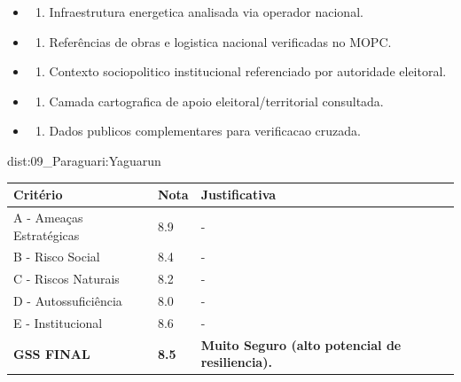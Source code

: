 {\begin{itemize}
\item
  \begin{enumerate}
  \def\labelenumi{\arabic{enumi})}
  \setcounter{enumi}{7}
  \tightlist
  \item
    Infraestrutura energetica analisada via operador nacional.
  \end{enumerate}
\item
  \begin{enumerate}
  \def\labelenumi{\arabic{enumi})}
  \setcounter{enumi}{8}
  \tightlist
  \item
    Referências de obras e logistica nacional verificadas no MOPC.
  \end{enumerate}
\item
  \begin{enumerate}
  \def\labelenumi{\arabic{enumi})}
  \setcounter{enumi}{9}
  \tightlist
  \item
    Contexto sociopolitico institucional referenciado por autoridade
    eleitoral.
  \end{enumerate}
\item
  \begin{enumerate}
  \def\labelenumi{\arabic{enumi})}
  \setcounter{enumi}{10}
  \tightlist
  \item
    Camada cartografica de apoio eleitoral/\allowbreak territorial consultada.
  \end{enumerate}
\item
  \begin{enumerate}
  \def\labelenumi{\arabic{enumi})}
  \setcounter{enumi}{11}
  \tightlist
  \item
    Dados publicos complementares para verificacao cruzada.
  \end{enumerate}
\end{itemize}}{dist:09_Paraguari:Yaguarun}
\begin{table}[ht!]
\small \begin{tabular}{p{3.0cm}p{0.8cm}p{6.0cm}} \toprule
\textbf{Critério} & \textbf{Nota} & \textbf{Justificativa} \\ \midrule
A - Ameaças Estratégicas & 8.9 & - \\
B - Risco Social & 8.4 & - \\
C - Riscos Naturais & 8.2 & - \\
D - Autossuficiência & 8.0 & - \\
E - Institucional & 8.6 & - \\
\midrule \textbf{GSS FINAL} & \textbf{8.5} & \textbf{Muito Seguro (alto potencial de resiliencia).} \\ \bottomrule \end{tabular}
\end{table}
